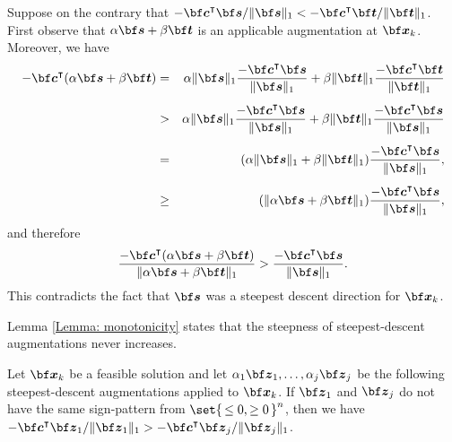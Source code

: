 \documentclass[moor]{informs1hack}              %
\def\ve#1{\mathchoice{\mbox{\boldmath$\displaystyle\bf#1$}}
{\mbox{\boldmath$\textstyle\bf#1$}}
{\mbox{\boldmath$\scriptstyle\bf#1$}}
{\mbox{\boldmath$\scriptscriptstyle\bf#1$}}}
\newcommand\vecc{{\ve c}}
\newcommand\ves{{\ve s}}
\newcommand\vet{{\ve t}}
\newcommand\vex{{\ve x}}
\newcommand\vez{{\ve z}}
\newcommand{\T}{{\intercal}} %
\begin{document}
  Suppose on the contrary that $-\vecc^\T\ves/\|\ves\|_1 < -\vecc^\T\vet/\|\vet\|_1$.
  First observe that $\alpha\ves+\beta\vet$ is an applicable augmentation at $\vex_k$. Moreover, we have
  \begin{eqnarray*}
    -\vecc^\T(\alpha\ves+\beta\vet) & = & \alpha\|\ves\|_1\frac{-\vecc^\T\ves}{\|\ves\|_1}+\beta\|\vet\|_1\frac{-\vecc^\T\vet}{\|\vet\|_1}\\[5pt]
    & > & \alpha\|\ves\|_1\frac{-\vecc^\T\ves}{\|\ves\|_1}+\beta\|\vet\|_1\frac{-\vecc^\T\ves}{\|\ves\|_1}\\[5pt]
    & = & (\alpha\|\ves\|_1+\beta\|\vet\|_1)\frac{-\vecc^\T\ves}{\|\ves\|_1},\\[5pt]
    & \geq & (\|\alpha\ves+\beta\vet\|_1)\frac{-\vecc^\T\ves}{\|\ves\|_1},
  \end{eqnarray*}
  and therefore
  \[
    \frac{-\vecc^\T(\alpha\ves+\beta\vet)}{\|\alpha\ves+\beta\vet\|_1}>\frac{-\vecc^\T\ves}{\|\ves\|_1}.
  \]
  This contradicts the fact that $\ves$ was a steepest descent direction for $\vex_k$.
 \Halmos
\endproof

Lemma \ref{Lemma: monotonicity} states that the steepness of steepest-descent augmentations never  increases.

\begin{lemma}\label{Lemma: chance of sign-pattern leads to change in slope}
  Let $\vex_k$ be a feasible solution and let $\alpha_1\vez_1,\ldots,\alpha_j\vez_j$ be the following steepest-descent augmentations applied to $\vex_k$. If $\vez_1$ and $\vez_j$ do not have the same sign-pattern from $\set{\,\leq 0,\geq 0\,}^n$, then we have $-\vecc^\T\vez_1/\|\vez_1\|_1>-\vecc^\T\vez_j/\|\vez_j\|_1$.
\end{lemma}
\end{document}
